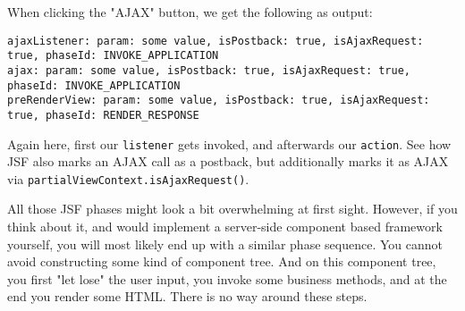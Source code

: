 When clicking the "AJAX" button, we get the following as output:
\begin{lstlisting}
ajaxListener: param: some value, isPostback: true, isAjaxRequest: true, phaseId: INVOKE_APPLICATION
ajax: param: some value, isPostback: true, isAjaxRequest: true, phaseId: INVOKE_APPLICATION
preRenderView: param: some value, isPostback: true, isAjaxRequest: true, phaseId: RENDER_RESPONSE
\end{lstlisting}
Again here, first our \texttt{listener} gets invoked, and afterwards our \texttt{action}.
See how JSF also marks an AJAX call as a postback, but additionally marks it as AJAX via \texttt{partialViewContext.isAjaxRequest()}.

All those JSF phases might look a bit overwhelming at first sight.
However, if you think about it, and would implement a server-side component based framework yourself, you will most likely end up with a similar phase sequence.
You cannot avoid constructing some kind of component tree.
And on this component tree, you first "let lose" the user input, you invoke some business methods, and at the end you render some HTML.
There is no way around these steps.

